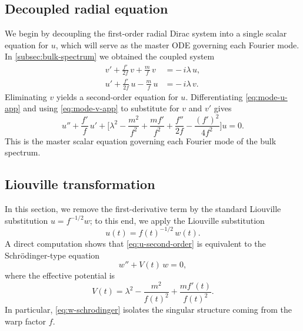 \documentclass[11pt]{article}
\theoremstyle{definition}
\numberwithin{equation}{section}
\begin{document}
\subsection{Decoupled radial equation}\label{app:heun-decoupled}
We begin by decoupling the first-order radial Dirac system into a single scalar equation
for $u$, which will serve as the master ODE governing each Fourier mode. In \autoref{subsec:bulk-spectrum} we obtained the coupled system
\begin{subequations}
\begin{align}
v' + \frac{f'}{2f}\,v + \frac{m}{f}\,v &= -\,i\lambda\,u, \label{eq:mode-v-app}\\
u' + \frac{f'}{2f}\,u - \frac{m}{f}\,u &= -\,i\lambda\,v. \label{eq:mode-u-app}
\end{align}
\end{subequations}
Eliminating \(v\) yields a second-order equation for \(u\). Differentiating \eqref{eq:mode-u-app} and using
\eqref{eq:mode-v-app} to substitute for \(v\) and \(v'\) gives
\begin{equation}\label{eq:u-second-order}
u'' + \frac{f'}{f}\,u'
+\Bigg[
\lambda^2
- \frac{m^2}{f^2}
+ \frac{m f'}{f^2}
+ \frac{f''}{2f}
- \frac{(f')^2}{4f^2}
\Bigg]u=0.
\end{equation}
This is the master scalar equation governing each Fourier mode of the bulk spectrum.

\subsection{Liouville transformation}\label{app:heun-liouville}
In this section, we remove the first-derivative term by the standard Liouville substitution $u=f^{-1/2}w$; to this end, we apply the Liouville substitution
\begin{equation}\label{eq:liouville-sub}
u(t)=f(t)^{-1/2}\,w(t).
\end{equation}
A direct computation shows that \eqref{eq:u-second-order} is equivalent to the Schr\"odinger-type equation
\begin{equation}\label{eq:w-schrodinger}
w'' + V(t)\,w=0,
\end{equation}
where the effective potential is
\begin{equation}\label{eq:V-effective}
V(t)=\lambda^2-\frac{m^2}{f(t)^2}+ \frac{m f'(t)}{f(t)^2}.
\end{equation}
In particular, \eqref{eq:w-schrodinger} isolates the singular structure coming from the warp factor \(f\).
\end{document}
